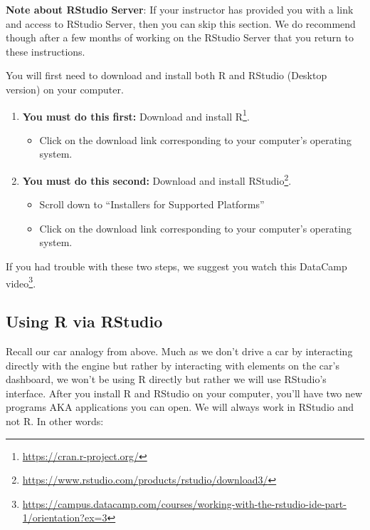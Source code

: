 \documentclass[12pt, krantz2,]{krantz}
\providecommand{\tightlist}{%
  \setlength{\itemsep}{0pt}\setlength{\parskip}{0pt}}
\renewenvironment{quote}{\begin{VF}}{\end{VF}}
\renewcommand{\href}[2]{#2\footnote{\url{#1}}}
\begin{document}
\begin{quote}
\textbf{Note about RStudio Server}: If your instructor has provided you with a link and access to RStudio Server, then you can skip this section. We do recommend though after a few months of working on the RStudio Server that you return to these instructions.
\end{quote}

You will first need to download and install both R and RStudio (Desktop version) on your computer.

\begin{enumerate}
\def\labelenumi{\arabic{enumi}.}
\tightlist
\item
  \textbf{You must do this first:} \href{https://cran.r-project.org/}{Download and install R}.

  \begin{itemize}
  \tightlist
  \item
    Click on the download link corresponding to your computer's operating system.
  \end{itemize}
\item
  \textbf{You must do this second:} \href{https://www.rstudio.com/products/rstudio/download3/}{Download and install RStudio}.

  \begin{itemize}
  \tightlist
  \item
    Scroll down to ``Installers for Supported Platforms''
  \item
    Click on the download link corresponding to your computer's operating system.
  \end{itemize}
\end{enumerate}

If you had trouble with these two steps, we suggest you watch this \href{https://campus.datacamp.com/courses/working-with-the-rstudio-ide-part-1/orientation?ex=3}{DataCamp video}.

\hypertarget{using-r-via-rstudio}{%
\subsection{Using R via RStudio}\label{using-r-via-rstudio}}

Recall our car analogy from above. Much as we don't drive a car by interacting directly with the engine but rather by interacting with elements on the car's dashboard, we won't be using R directly but rather we will use RStudio's interface. After you install R and RStudio on your computer, you'll have two new programs AKA applications you can open. We will always work in RStudio and not R. In other words:
\end{document}
